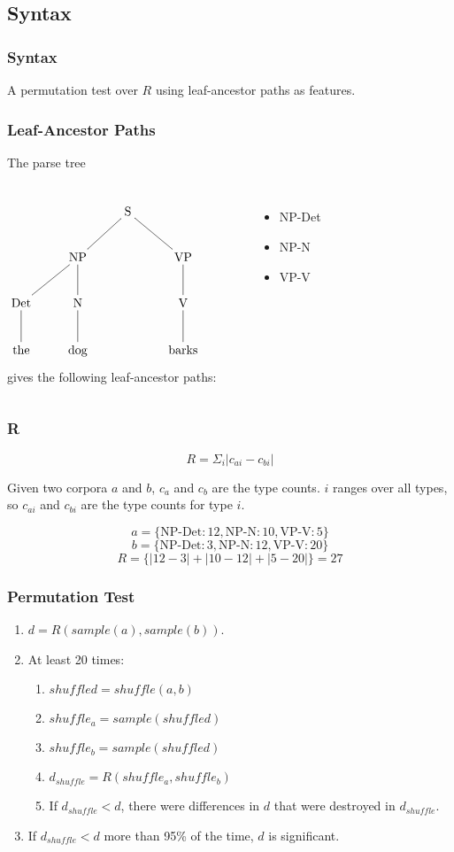 \documentclass{beamer}
\begin{document}
\subsection{Syntax}
\begin{frame}
\frametitle{Syntax}
  A permutation test over $R$ using leaf-ancestor paths as features.
\end{frame}
\begin{frame}
  \frametitle{Leaf-Ancestor Paths}
The parse tree
\begin{columns}
\[\xymatrix{
  &&\textrm{S} \ar@{-}[dl] \ar@{-}[dr] &&\\
  &\textrm{NP} \ar@{-}[d] \ar@{-}[dl] &&\textrm{VP} \ar@{-}[d]\\
  \textrm{Det} \ar@{-}[d] & \textrm{N} \ar@{-}[d] && \textrm{V} \ar@{-}[d] \\
\textrm{the}& \textrm{dog} && \textrm{barks}\\}
\]
gives the following leaf-ancestor paths:
\begin{itemize}
\item NP-Det
\item NP-N
\item VP-V
\end{itemize}
\end{columns}
\end{frame}
\begin{frame}
\frametitle{R}
\begin{definition}
\begin{equation}
R = \Sigma_i |c_{ai} - c_{bi}|
\label{rmeasure}
\end{equation}
\end{definition}
\noindent{}Given two corpora $a$ and $b$, $c_a$ and $c_b$ are the type
counts. $i$ ranges over all types, so $c_{ai}$ and $c_{bi}$ are the
type counts for type $i$.
  \begin{example}
    \[a=\{\textrm{NP-Det}:12, \textrm{NP-N}:10, \textrm{VP-V}:5\}\]
    \[b=\{\textrm{NP-Det}:3, \textrm{NP-N}:12, \textrm{VP-V}:20\}\]
    \[R = \{|12-3| + |10-12| + |5-20|\} = 27 \]
  \end{example}
\end{frame}
\begin{frame}
  \frametitle{Permutation Test}
  \begin{enumerate}
  \item $d = R(sample(a),sample(b))$.
  \item At least 20 times:
    \begin{enumerate}
    \item $shuffled = shuffle(a,b)$
    \item $shuffle_a = sample(shuffled)$
    \item $shuffle_b = sample(shuffled)$
    \item $d_{shuffle} = R(shuffle_a,shuffle_b)$
    \item If $d_{shuffle} < d$, there were differences in
      $d$ that were destroyed in $d_{shuffle}$.
  \end{enumerate}
  \item If $d_{shuffle} < d$ more than 95\% of the time, $d$ is significant.
  \end{enumerate}
\end{frame}
\end{document}

